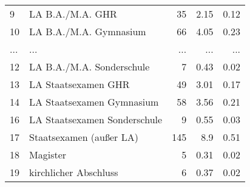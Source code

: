 \begin{longtable}{lXrrr}
        9 & \multicolumn{1}{X}{LA B.A./M.A. GHR} & %
          \num{35} &
          \num[round-mode=places,round-precision=2]{2,15} &
          \num[round-mode=places,round-precision=2]{0,12} \\
        10 & \multicolumn{1}{X}{LA B.A./M.A. Gymnasium} & %
          \num{66} &
          \num[round-mode=places,round-precision=2]{4,05} &
          \num[round-mode=places,round-precision=2]{0,23} \\
       ... & ... & ... & ... & ... \\
        12 & \multicolumn{1}{X}{LA B.A./M.A. Sonderschule} & %
          \num{7} &
          \num[round-mode=places,round-precision=2]{0,43} &
          \num[round-mode=places,round-precision=2]{0,02} \\

        13 & \multicolumn{1}{X}{LA Staatsexamen GHR} & %
          \num{49} &
          \num[round-mode=places,round-precision=2]{3,01} &
          \num[round-mode=places,round-precision=2]{0,17} \\

        14 & \multicolumn{1}{X}{LA Staatsexamen Gymnasium} & %
          \num{58} &
          \num[round-mode=places,round-precision=2]{3,56} &
          \num[round-mode=places,round-precision=2]{0,21} \\

        16 & \multicolumn{1}{X}{LA Staatsexamen Sonderschule} & %
          \num{9} &
          \num[round-mode=places,round-precision=2]{0,55} &
          \num[round-mode=places,round-precision=2]{0,03} \\

        17 & \multicolumn{1}{X}{Staatsexamen (außer LA)} & %
          \num{145} &
          \num[round-mode=places,round-precision=2]{8,9} &
          \num[round-mode=places,round-precision=2]{0,51} \\

        18 & \multicolumn{1}{X}{Magister} & %
          \num{5} &
          \num[round-mode=places,round-precision=2]{0,31} &
          \num[round-mode=places,round-precision=2]{0,02} \\

        19 & \multicolumn{1}{X}{kirchlicher Abschluss} & %
          \num{6} &
          \num[round-mode=places,round-precision=2]{0,37} &
          \num[round-mode=places,round-precision=2]{0,02} \\


\end{longtable}
